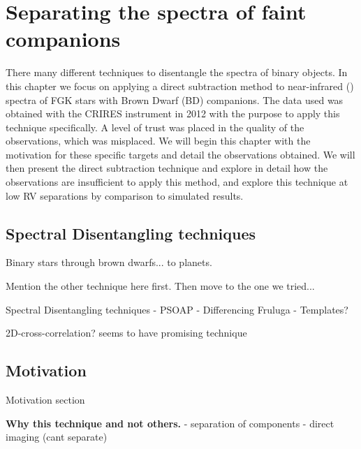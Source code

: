 

\chapter{Separating the spectra of faint companions} %
\label{cha:direct_recovery}

There many different techniques to disentangle the spectra of binary objects. In this chapter we focus on applying a direct subtraction method to near-infrared (\nir{}) spectra of {FGK} stars with Brown Dwarf (BD) companions. The data used was obtained with the {CRIRES} instrument in 2012 with the purpose to apply this technique specifically. A level of trust was placed in the quality of the observations, which was misplaced. We will begin this chapter with the motivation for these specific targets and detail the observations obtained. We will then present the direct subtraction technique and explore in detail how the observations are insufficient to apply this method, and explore this technique at low RV separations by comparison to simulated results.


\section{Spectral Disentangling techniques}

Binary stars through brown dwarfs... to planets.


Mention the other technique here first. Then move to the one we tried...




Spectral Disentangling techniques
- PSOAP
- Differencing Fruluga
- Templates?

2D-cross-correlation?   \citet{piskorz_evidence_2016} seems to have promising technique



\section{Motivation}

Motivation section

\textbf{Why this technique and not others.}
- separation of components
- direct imaging (cant separate)


